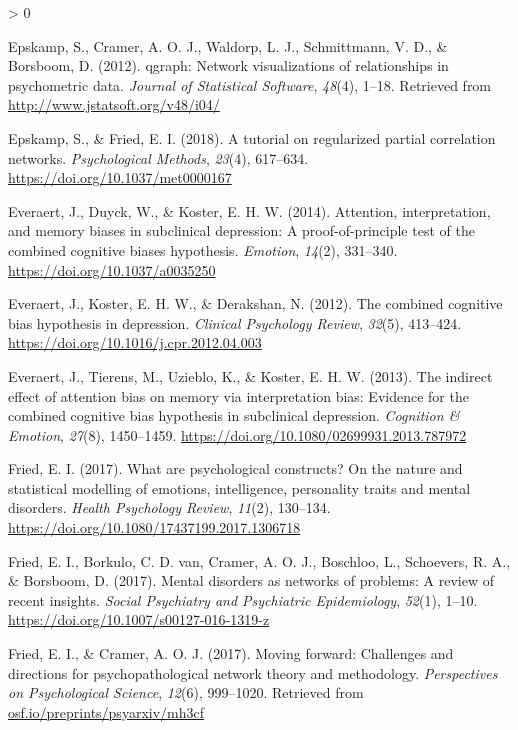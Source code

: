 \documentclass[
  english,
  man]{apa6}
\newlength{\cslhangindent}
\newenvironment{CSLReferences}[2] %
 {%
  \setlength{\parindent}{0pt}
  \ifodd #1 \everypar{\setlength{\hangindent}{\cslhangindent}}\ignorespaces\fi
  \ifnum #2 > 0
  \setlength{\parskip}{#2\baselineskip}
  \fi
 }%
 {}
\begin{document}
\begin{CSLReferences}{1}{0}
\leavevmode\hypertarget{ref-R-qgraph}{}%
Epskamp, S., Cramer, A. O. J., Waldorp, L. J., Schmittmann, V. D., \& Borsboom, D. (2012). {qgraph}: Network visualizations of relationships in psychometric data. \emph{Journal of Statistical Software}, \emph{48}(4), 1--18. Retrieved from \url{http://www.jstatsoft.org/v48/i04/}

\leavevmode\hypertarget{ref-epskamp_tutorial_2018}{}%
Epskamp, S., \& Fried, E. I. (2018). A tutorial on regularized partial correlation networks. \emph{Psychological Methods}, \emph{23}(4), 617--634. \url{https://doi.org/10.1037/met0000167}

\leavevmode\hypertarget{ref-Everaert2014}{}%
Everaert, J., Duyck, W., \& Koster, E. H. W. (2014). Attention, interpretation, and memory biases in subclinical depression: A proof-of-principle test of the combined cognitive biases hypothesis. \emph{Emotion}, \emph{14}(2), 331--340. \url{https://doi.org/10.1037/a0035250}

\leavevmode\hypertarget{ref-everaert_combined_2012}{}%
Everaert, J., Koster, E. H. W., \& Derakshan, N. (2012). The combined cognitive bias hypothesis in depression. \emph{Clinical Psychology Review}, \emph{32}(5), 413--424. \url{https://doi.org/10.1016/j.cpr.2012.04.003}

\leavevmode\hypertarget{ref-Everaert2013}{}%
Everaert, J., Tierens, M., Uzieblo, K., \& Koster, E. H. W. (2013). The indirect effect of attention bias on memory via interpretation bias: Evidence for the combined cognitive bias hypothesis in subclinical depression. \emph{Cognition \& Emotion}, \emph{27}(8), 1450--1459. \url{https://doi.org/10.1080/02699931.2013.787972}

\leavevmode\hypertarget{ref-fried_what_2017}{}%
Fried, E. I. (2017). What are psychological constructs? {On} the nature and statistical modelling of emotions, intelligence, personality traits and mental disorders. \emph{Health Psychology Review}, \emph{11}(2), 130--134. \url{https://doi.org/10.1080/17437199.2017.1306718}

\leavevmode\hypertarget{ref-fried_mental_2017}{}%
Fried, E. I., Borkulo, C. D. van, Cramer, A. O. J., Boschloo, L., Schoevers, R. A., \& Borsboom, D. (2017). Mental disorders as networks of problems: A review of recent insights. \emph{Social Psychiatry and Psychiatric Epidemiology}, \emph{52}(1), 1--10. \url{https://doi.org/10.1007/s00127-016-1319-z}

\leavevmode\hypertarget{ref-fried_moving_2017}{}%
Fried, E. I., \& Cramer, A. O. J. (2017). Moving forward: Challenges and directions for psychopathological network theory and methodology. \emph{Perspectives on Psychological Science}, \emph{12}(6), 999--1020. Retrieved from \href{https://osf.io/preprints/psyarxiv/mh3cf}{osf.io/preprints/psyarxiv/mh3cf}


\end{CSLReferences}
\end{document}
